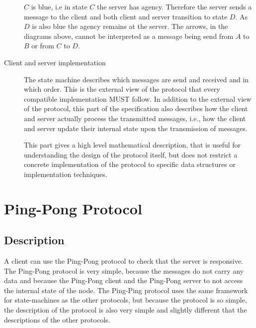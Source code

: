 \documentclass{report}
\newcommand{\hsref}[1]{} %
\newcommand{\wip}[1]{\color{magenta}{#1}\color{black}}
\newcommand{\msg}[1]{\texttt{#1}}
\theoremstyle{definition}{
  \newtheorem{lemma}{Lemma}[section] %
  \newtheorem{definition}[lemma]{Definition}
}
\theoremstyle{theorem}{
  \newtheorem{invariant}[lemma]{Invariant}
  \newtheorem{proofobligation}[lemma]{Proof Obligation}
}
\numberwithin{equation}{lemma}
\begin{document}
\begin{description}
      $C$ is blue, i.e in state $C$ the server has agency.
      Therefore the server sends a message to the client and
      both client and server transition to state $D$.
      As $D$ is also blue the agency remains at the server.
      The arrows, in the diagrams above,
      cannot be interpreted as a message being send from $A$ to $B$ or from $C$ to $D$.

\item[Client and server implementation]
  The state machine describes which messages are send and received and in which order.
  This is the external view of the protocol that every compatible implementation MUST follow.
  In addition to the external view of the protocol, this part of the specification also describes
  how the client and server actually process the transmitted messages,
  i.e., how the client and server update their internal state upon the transmission of messages.

  This part gives a high level mathematical description, that is useful for understanding the design
  of the protocol itself,
  but does not restrict a concrete implementation of the protocol to specific data structures
  or implementation techniques.
  \wip{
    Operational semantic/ inference rule -style formalism? <- not good,
    but there are even more side-effects !
    there are many mini protocols running in parallell and many layers of abstraction
    imperative update-style !
  }
\end{description}

\section{Ping-Pong Protocol}
\label{ping-pong-protocol}
\hsref{typed-protocols/src/Network/TypedProtocol/PingPong/Type.hs}
\newcommand{\Ping}{\msg{Ping}}
\newcommand{\Pong}{\msg{Pong}}

\subsection{Description}
A client can use the Ping-Pong protocol to check that the server is responsive.
The Ping-Pong protocol is very simple, because the messages do not carry any data and
because the Ping-Pong client and the Ping-Pong server to not access the internal state of the node.
The Ping-Ping protocol uses the same framework for state-machines as the other protocols,
but because the protocol is so simple, the description of the protocol is also very simple and slightly
different that the descriptions of the other protocols.
\end{document}
